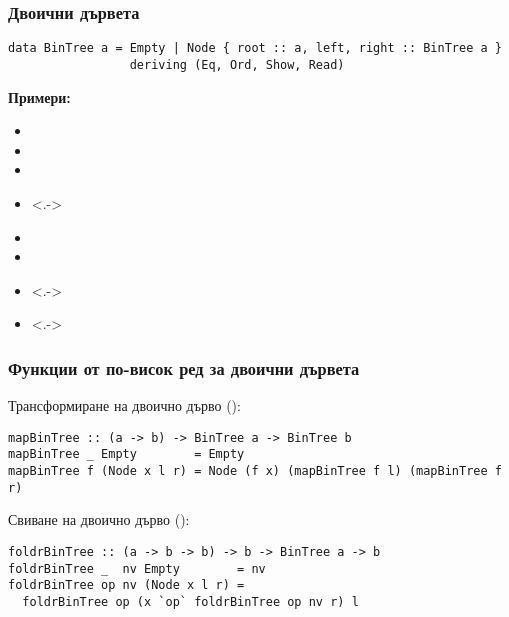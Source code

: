 \documentclass[alsotrans]{beamerswitch}
\begin{document}
\begin{frame}[fragile]
  \frametitle{Двоични дървета}
\begin{lstlisting}
data BinTree a = Empty | Node { root :: a, left, right :: BinTree a }
                 deriving (Eq, Ord, Show, Read)
\end{lstlisting}
  \textbf{Примери:}
  \begin{itemize}[<+->]
  \item {}
  \item {}
  \item {}
  \item<.-> 
  \item {}
  \item {}
  \item<.-> 
  \item<.-> 
  \end{itemize}
\end{frame}

\begin{frame}[fragile]
  \frametitle{Функции от по-висок ред за двоични дървета}

  Трансформиране на двоично дърво ():
  \pause
\begin{lstlisting}
mapBinTree :: (a -> b) -> BinTree a -> BinTree b
mapBinTree _ Empty        = Empty
mapBinTree f (Node x l r) = Node (f x) (mapBinTree f l) (mapBinTree f r)
\end{lstlisting}
  \vspace{4ex}
  \pause
  Свиване на двоично дърво ():
\begin{lstlisting}
foldrBinTree :: (a -> b -> b) -> b -> BinTree a -> b
foldrBinTree _  nv Empty        = nv
foldrBinTree op nv (Node x l r) =
  foldrBinTree op (x `op` foldrBinTree op nv r) l
\end{lstlisting}
\end{frame}
\end{document}
